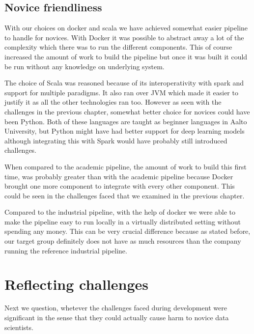 \subsection{Novice friendliness}

With our choices on docker and scala we have achieved somewhat easier pipeline to handle for novices.
With Docker it was possible to abstract away a lot of the complexity which there was to run the different components.
This of course increased the amount of work to build the pipeline but once it was built it could be run without any knowledge on underlying system.

The choice of Scala was reasoned because of its interoperativity with spark and support for multiple paradigms.
It also ran over JVM which made it easier to justify it as all the other technologies ran too.
However as seen with the challenges in the previous chapter, somewhat better choice for novices could have been Python.
Both of these languages are taught as beginner languages in Aalto University, but Python might have had better support for deep learning models although integrating this with Spark would have probably still introduced challenges.

When compared to the academic pipeline, the amount of work to build this first time, was probably greater than with the academic pipeline because Docker brought one more component to integrate with every other component.
This could be seen in the challenges faced that we examined in the previous chapter.

Compared to the industrial pipeline, with the help of docker we were able to make the pipeline easy to run locally in a virtually distributed setting without spending any money.
This can be very crucial difference because as stated before, our target group definitely does not have as much resources than the company running the reference industrial pipeline.

\section{Reflecting challenges}

Next we question, whetever the challenges faced during development were significant in the sense that they could actually cause harm to novice data scientists.

